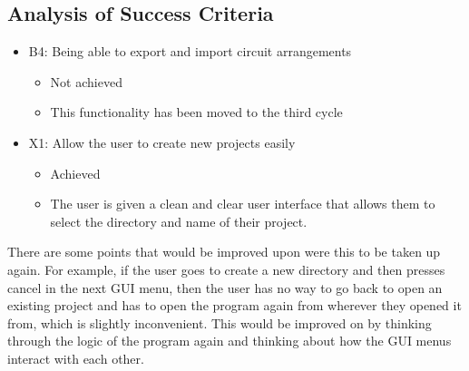 
    \subsection{Analysis of Success Criteria}
    
    \begin{itemize}
        \item B4: Being able to export and import circuit arrangements
        \begin{itemize}
            \item Not achieved
            \item This functionality has been moved to the third cycle
        \end{itemize}
        \item X1: Allow the user to create new projects easily
        \begin{itemize}
            \item Achieved
            \item The user is given a clean and clear user interface that allows them to select the directory and name of their project.
        \end{itemize}
    \end{itemize}




    There are some points that would be improved upon were this to be taken up again. 
    For example, if the user goes to create a new directory and then presses cancel in the next GUI menu, then the user has no way to go back to open an existing project and has to open the program again from wherever they opened it from, which is slightly inconvenient. 
    This would be improved on by thinking through the logic of the program again and thinking about how the GUI menus interact with each other. 



